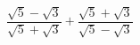 \begin{ex}[type=calculate]
	\begin{condition}
		\( \dfrac{\sqrt{5}-\sqrt{3}}{\sqrt{5}+\sqrt{3}}+\dfrac{\sqrt{5}+\sqrt{3}}{\sqrt{5}-\sqrt{3}} \)
	\end{condition}
\end{ex}